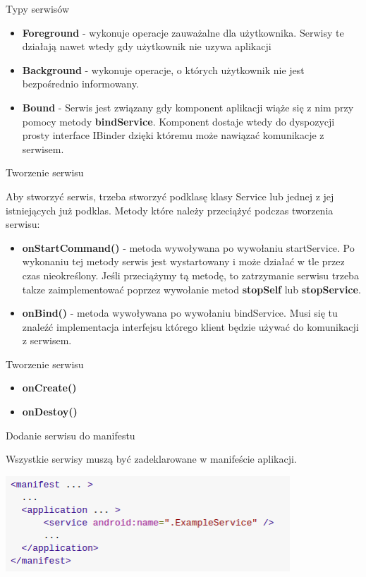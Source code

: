 \documentclass{beamer}
\begin{document}
\begin{frame}{Typy serwisów}
	\begin{itemize}
		\item \textbf{Foreground} - wykonuje operacje zauważalne dla użytkownika. Serwisy te działają nawet wtedy gdy użytkownik nie uzywa aplikacji
		\item \textbf{Background} - wykonuje operacje, o których użytkownik nie jest bezpośrednio informowany.
		\item \textbf{Bound} - Serwis jest związany gdy komponent aplikacji wiąże się z nim przy pomocy metody \textbf{bindService}. Komponent dostaje wtedy do dyspozycji prosty interface IBinder dzięki któremu może nawiązać komunikacje z serwisem.
	\end{itemize}
\end{frame}

\begin{frame}{Tworzenie serwisu}
	\begin{block}{}
		Aby stworzyć serwis, trzeba stworzyć podklasę klasy Service lub jednej z jej istniejących już podklas.
		Metody które należy przeciążyć podczas tworzenia serwisu:
		\begin{itemize}
			\item \textbf{onStartCommand()} - metoda wywoływana po wywołaniu startService. Po wykonaniu tej metody serwis jest wystartowany i może działać w tle przez czas nieokreślony. Jeśli przeciążymy tą metodę, to zatrzymanie serwisu trzeba takze zaimplementować poprzez wywołanie metod \textbf{stopSelf} lub \textbf{stopService}.
			\item \textbf{onBind()} - metoda wywoływana po wywołaniu bindService. Musi się tu znaleźć implementacja interfejsu którego klient będzie używać do komunikacji z serwisem.
		\end{itemize}
	\end{block}
\end{frame}

\begin{frame}{Tworzenie serwisu}
	\begin{block}{}
		\begin{itemize}
			\item \textbf{onCreate()}
			\item \textbf{onDestoy()}
		\end{itemize}
	\end{block}
\end{frame}

\begin{frame}{Dodanie serwisu do manifestu}
	\begin{block}{}
		Wszystkie serwisy muszą być zadeklarowane w manifeście aplikacji.
	\end{block}
	\includegraphics[width=0.8\textwidth]{service-manifest}
\end{frame}
\end{document}
